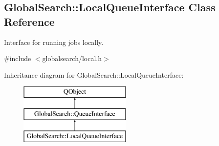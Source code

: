 \hypertarget{classGlobalSearch_1_1LocalQueueInterface}{}\subsection{Global\+Search\+:\+:Local\+Queue\+Interface Class Reference}
\label{classGlobalSearch_1_1LocalQueueInterface}


Interface for running jobs locally.  




{\ttfamily \#include $<$globalsearch/local.\+h$>$}

Inheritance diagram for Global\+Search\+:\+:Local\+Queue\+Interface\+:\begin{figure}[H]
\begin{center}
\leavevmode
\includegraphics[height=3.000000cm]{classGlobalSearch_1_1LocalQueueInterface}
\end{center}
\end{figure}
